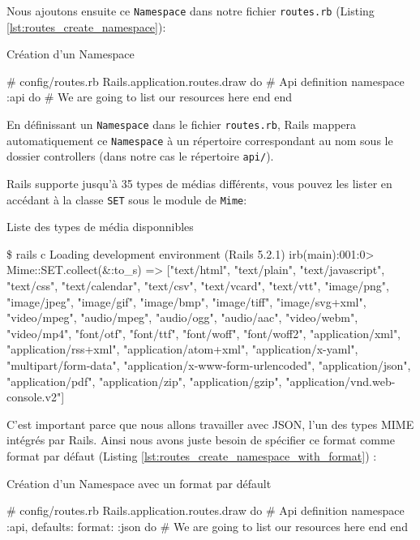\documentclass[]{report}
\begin{document}
      Nous ajoutons ensuite ce \verb|Namespace| dans notre fichier \verb|routes.rb| (Listing \ref{lst:routes_create_namespace}):

      \begin{listing}
        \caption{Création d'un Namespace}
        \label{lst:routes_create_namespace}
        \begin{rubycode}
        # config/routes.rb
        Rails.application.routes.draw do
          # Api definition
          namespace :api do
            # We are going to list our resources here
          end
        end
        \end{rubycode}
      \end{listing}


      En définissant un \verb|Namespace| dans le fichier \verb|routes.rb|, Rails mappera automatiquement ce \verb|Namespace| à un répertoire correspondant au nom sous le dossier controllers (dans notre cas le répertoire \verb|api/|).

      Rails supporte jusqu'à 35 types de médias différents, vous pouvez les lister en accédant à la classe \verb|SET| sous le module de \verb|Mime|:

      \begin{listing}
        \caption{Liste des types de média disponnibles}
        \begin{bashcode}
        \$ rails c
        Loading development environment (Rails 5.2.1)
        irb(main):001:0> Mime::SET.collect(&:to_s)
        => ["text/html", "text/plain", "text/javascript", "text/css", "text/calendar", "text/csv", "text/vcard", "text/vtt", "image/png", "image/jpeg", "image/gif", "image/bmp", "image/tiff", "image/svg+xml", "video/mpeg", "audio/mpeg", "audio/ogg", "audio/aac", "video/webm", "video/mp4", "font/otf", "font/ttf", "font/woff", "font/woff2", "application/xml", "application/rss+xml", "application/atom+xml", "application/x-yaml", "multipart/form-data", "application/x-www-form-urlencoded", "application/json", "application/pdf", "application/zip", "application/gzip", "application/vnd.web-console.v2"]
        \end{bashcode}
      \end{listing}

      C'est important parce que nous allons travailler avec JSON, l'un des types MIME intégrés par Rails. Ainsi nous avons juste besoin de spécifier ce format comme format par défaut (Listing \ref{lst:routes_create_namespace_with_format}) :

      \begin{listing}
        \caption{Création d'un Namespace avec un format par défault}
        \label{lst:routes_create_namespace_with_format}
        \begin{rubycode}[language=ruby, ]
        # config/routes.rb
        Rails.application.routes.draw do
          # Api definition
          namespace :api, defaults: { format: :json }  do
            # We are going to list our resources here
          end
        end
        \end{rubycode}
      \end{listing}
\end{document}
